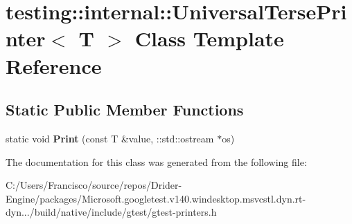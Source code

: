 \hypertarget{classtesting_1_1internal_1_1_universal_terse_printer}{}\section{testing\+:\+:internal\+:\+:Universal\+Terse\+Printer$<$ T $>$ Class Template Reference}
\label{classtesting_1_1internal_1_1_universal_terse_printer}
\subsection*{Static Public Member Functions}
\begin{DoxyCompactItemize}
\item 
\mbox{\label{classtesting_1_1internal_1_1_universal_terse_printer_a042249cdb42fdb77588c9ad54ea7ed54}} 
static void {\bfseries Print} (const T \&value, \+::std\+::ostream $\ast$os)
\end{DoxyCompactItemize}


The documentation for this class was generated from the following file\+:\begin{DoxyCompactItemize}
\item 
C\+:/\+Users/\+Francisco/source/repos/\+Drider-\/\+Engine/packages/\+Microsoft.\+googletest.\+v140.\+windesktop.\+msvcstl.\+dyn.\+rt-\/dyn.../build/native/include/gtest/gtest-\/printers.\+h\end{DoxyCompactItemize}
